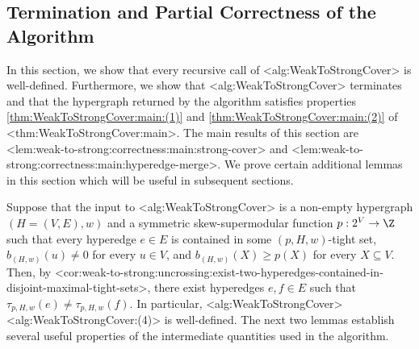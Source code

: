 \documentclass{article}
\def\Cref#1{<#1>}%
\newcommand{\knote}[1]{{\color{red}[{\tiny Karthik: \bf #1}]\marginpar{\color{red}*}}}
\newcommand{\maximalTightSetContainingHyperedge}[1]{\ensuremath{\tau_{#1}}\xspace}
\begin{document}
\subsection{Termination and Partial Correctness of the Algorithm}
\label{sec:WeakToStrongCover:PartialCorrectness}
In this section, we show that every recursive call of \Cref{alg:WeakToStrongCover} is well-defined. 
Furthermore, we show that \Cref{alg:WeakToStrongCover} terminates and that the hypergraph returned by the algorithm satisfies properties \ref{thm:WeakToStrongCover:main:(1)} and \ref{thm:WeakToStrongCover:main:(2)} of \Cref{thm:WeakToStrongCover:main}. The main results of this section are \Cref{lem:weak-to-strong:correctness:main:strong-cover} and \Cref{lem:weak-to-strong:correctness:main:hyperedge-merge}. We prove certain additional lemmas in this section which will be useful in subsequent sections. 
 
    Suppose that the input to \Cref{alg:WeakToStrongCover} is a non-empty hypergraph $(H = (V, E), w)$ and a symmetric skew-supermodular function $p:2^V\rightarrow \Z$ 
such that every hyperedge $e \in E$ is contained in some $(p, H, w)$-tight set, $b_{(H,w)}(u) \not = 0$ for every $u \in V$, and $b_{(H,w)}(X) \geq p(X)$ for every $X \subseteq V$. 
  Then, by \Cref{cor:weak-to-strong:uncrossing:exist-two-hyperedges-contained-in-disjoint-maximal-tight-sets}, there exist hyperedges $e , f \in E$ such that $\maximalTightSetContainingHyperedge{p, H, w}(e) \not = \maximalTightSetContainingHyperedge{p, H, w}(f)$. In particular, \Cref{alg:WeakToStrongCover} \Cref{alg:WeakToStrongCover:(4)} is well-defined. 
  The next two lemmas establish several useful properties of the intermediate quantities used in the algorithm.
\end{document}
